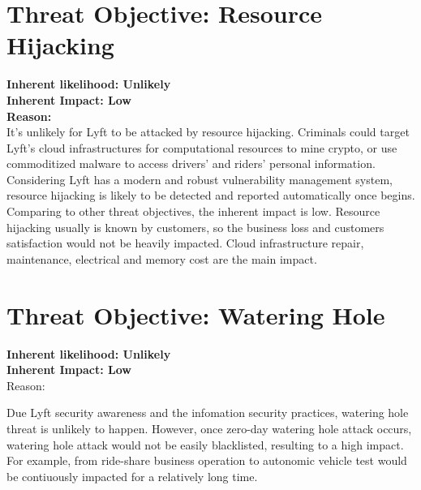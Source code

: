 \documentclass[11pt]{article}
\begin{document}
\section{Threat Objective: Resource Hijacking}


\begin{boxB}
    
    \textbf{Inherent likelihood: Unlikely}\\
    \textbf{Inherent Impact: Low}\\

    \textbf{Reason:}\\

    
    
    It's unlikely for Lyft to be attacked by resource hijacking. Criminals could target Lyft's cloud infrastructures for computational resources to mine crypto, or use commoditized malware to access drivers' and riders' personal information. Considering Lyft has a modern and robust vulnerability management system\cite{Chantavy_2022}, resource hijacking is likely to be detected and reported automatically once begins.\\

    Comparing to other threat objectives, the inherent impact is low. Resource hijacking usually is known by customers, so the business loss and customers satisfaction would not be heavily impacted. Cloud infrastructure repair, maintenance,  electrical and memory cost are the main impact.
    \end{boxB}


\section{Threat Objective: Watering Hole}

\begin{boxB}

    \textbf{Inherent likelihood: Unlikely}\\
    \textbf{Inherent Impact: Low}\\

    Reason:

    Due Lyft security awareness and the infomation security practices, watering hole threat is unlikely to happen. However, once zero-day watering hole attack occurs, watering hole attack would not be easily blacklisted, resulting to a high impact. For example, from ride-share business operation to autonomic vehicle test would be contiuously impacted for a relatively long time.

\end{boxB}
\end{document}
